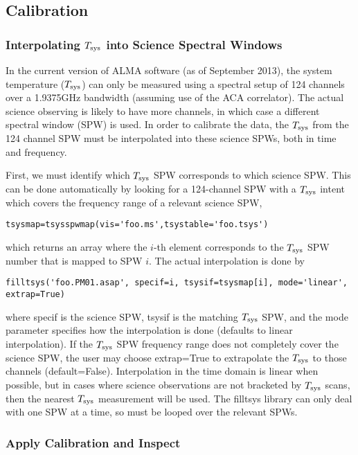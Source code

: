 \subsection{Calibration}
\subsubsection{Interpolating $T_{\rm sys}$ into Science Spectral Windows}
In the current version of ALMA software (as of September 2013), the
system temperature ($T_{\rm sys}$) can only be measured using a
spectral setup of 124 channels over a 1.9375GHz bandwidth (assuming
use of the ACA correlator).  The actual science observing is likely to
have more channels, in which case a different spectral window (SPW) is
used.  In order to calibrate the data, the $T_{\rm sys}$ from the 124
channel SPW must be interpolated into these science SPWs, both in time
and frequency.

First, we must identify which $T_{\rm sys}$ SPW corresponds to which
science SPW.  This can be done automatically by looking for a
124-channel SPW with a $T_{\rm sys}$ intent which covers the frequency
range of a relevant science SPW,
\begin{verbatim}
tsysmap=tsysspwmap(vis='foo.ms',tsystable='foo.tsys')
\end{verbatim}
which returns an array where the $i$-th element corresponds to the $T_{\rm sys}$ SPW number 
that is mapped to SPW $i$.  The actual interpolation is done by 
\begin{verbatim}
filltsys('foo.PM01.asap', specif=i, tsysif=tsysmap[i], mode='linear', extrap=True)
\end{verbatim}
where specif is the science SPW, tsysif is the matching $T_{\rm sys}$
SPW, and the mode parameter specifies how the interpolation is done
(defaults to linear interpolation).  If the $T_{\rm sys}$ SPW
frequency range does not completely cover the science SPW, the user
may choose extrap=True to extrapolate the $T_{\rm sys}$ to those
channels (default=False).  Interpolation in the time domain is linear
when possible, but in cases where science observations are not
bracketed by $T_{\rm sys}$ scans, then the nearest $T_{\rm sys}$
measurement will be used.  The filltsys library can only deal with one
SPW at a time, so must be looped over the relevant SPWs.

\subsubsection{Apply Calibration and Inspect}

